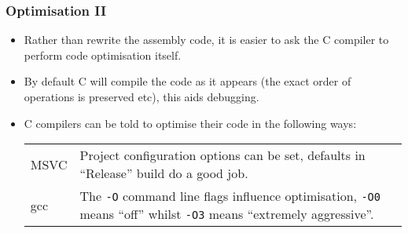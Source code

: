 \documentclass[smaller,table]{beamer} %
\begin{document}
\begin{frame}
\frametitle{Optimisation II}
\begin{itemize}
\item Rather than rewrite the assembly code, it is easier to ask the C compiler to perform code optimisation itself.
\item By default C will compile the code as it appears (the exact order of operations is preserved etc), this aids debugging.
\item C compilers can be told to optimise their code in the following ways:
\begin{center}
\begin{tabular}{l p{220pt}}
MSVC&Project configuration options can be set, defaults in ``Release'' build do a good job.\\
gcc&The {\tt -O} command line flags influence optimisation, {\tt -O0} means ``off'' whilst {\tt -O3} means ``extremely aggressive''.
\end{tabular}
\end{center}
\end{itemize}
\end{frame}
\end{document}
